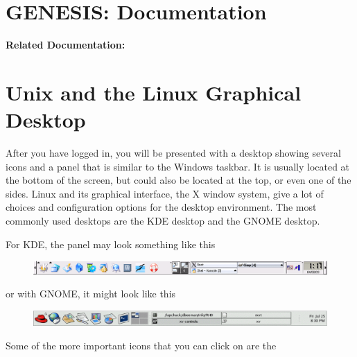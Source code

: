 \documentclass[12pt]{article}
\begin{document}
\section*{GENESIS: Documentation}

{\bf Related Documentation:}

\section*{Unix and the Linux Graphical Desktop}

After you have logged in, you will be presented with a desktop showing several icons and a panel that is similar to the Windows taskbar. It is usually located at the bottom of the screen, but could also be located at the top, or even one of the sides. Linux and its graphical interface, the X window system, give a lot of choices and configuration options for the desktop environment. The most commonly used desktops are the KDE desktop and the GNOME desktop.

For KDE, the panel may look something like this

\begin{figure}[h]
  \centering
 \includegraphics[scale=0.35]{figures/kde-gnxbar.eps}
  \label{fig:kde-gnxbar}
\end{figure}

or with GNOME, it might look like this

\begin{figure}[h]
  \centering
 \includegraphics[scale=0.35]{figures/gnomebar-term.eps}
  \label{fig:gnomegnxbar}
\end{figure}

Some of the more important icons that you can click on are the
\end{document}
